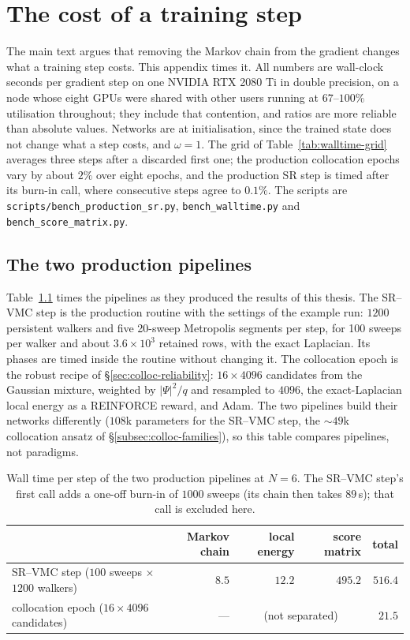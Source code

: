 \chapter{The cost of a training step}
\label{app:walltime}

The main text argues that removing the Markov chain from the gradient changes what a training
step costs. This appendix times it. All numbers are wall-clock seconds per gradient step on one
NVIDIA RTX 2080 Ti in double precision, on a node whose eight GPUs were shared with other users
running at $67$--$100\%$ utilisation throughout; they include that contention, and ratios are
more reliable than absolute values. Networks are at initialisation, since the trained state
does not change what a step costs, and $\omega=1$. The grid of
Table~\ref{tab:walltime-grid} averages three steps after a discarded first one; the production
collocation epochs vary by about $2\%$ over eight epochs, and the production SR step is timed
after its burn-in call, where consecutive steps agree to $0.1\%$. The scripts are \texttt{scripts/bench\_production\_sr.py},
\texttt{bench\_walltime.py} and \texttt{bench\_score\_matrix.py}.

\section{The two production pipelines}

Table~\ref{tab:walltime-production} times the pipelines as they produced the results of this
thesis. The SR--VMC step is the production routine with the settings of the example run:
$1200$ persistent walkers and five 20-sweep Metropolis segments per step, for 100 sweeps per
walker and about $3.6\times10^3$ retained rows, with the exact Laplacian. Its phases are timed inside the
routine without changing it. The collocation epoch is the robust recipe of
\S\ref{sec:colloc-reliability}: $16\times4096$ candidates from the Gaussian mixture, weighted
by $|\Psi|^2/q$ and resampled to $4096$, the exact-Laplacian local energy as a REINFORCE reward,
and Adam. The two pipelines build their networks differently ($108$k parameters for the
SR--VMC step, the ${\sim}49$k collocation ansatz of \S\ref{subsec:colloc-families}), so this
table compares pipelines, not paradigms.

\begin{table}[H]
\centering
\caption[Wall time of the production pipelines]{Wall time per step of the two production
pipelines at $N{=}6$. The SR--VMC step's first call adds a one-off burn-in of $1000$ sweeps
(its chain then takes $89$\,s); that call is excluded here.}
\label{tab:walltime-production}
\small
\begin{tabular}{l rrrr}
\toprule
 & Markov chain & local energy & score matrix & total \\
\midrule
SR--VMC step ($100$ sweeps $\times$ $1200$ walkers) & $8.5$ & $12.2$ & $495.2$ & $516.4$ \\
collocation epoch ($16\times4096$ candidates) & --- & \multicolumn{2}{c}{(not separated)} & $21.5$ \\
\bottomrule
\end{tabular}
\end{table}

